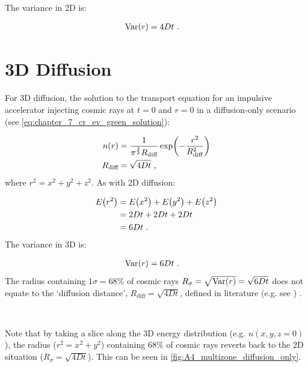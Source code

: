 \noindent The variance in 2D is:

\begin{equation}
    \begin{aligned}
        \mathrm{Var}\qty(r)&=4Dt\text{ .} 
    \end{aligned}
\end{equation}

\section{3D Diffusion}

For 3D diffusion, the solution to the transport equation for an impulsive accelerator injecting cosmic rays at $t=0$ and $r=0$ in a diffusion-only scenario (see \autoref{eq:chapter_7_cr_ev_green_solution}):

\begin{equation}
    \begin{aligned}
        n\qty(r)&=\frac{1}{\pi^{\frac{3}{2}} R_\text{diff}}\exp(-\frac{r^2}{R_\text{diff}^2}) \\
        R_\text{diff}&=\sqrt{4Dt}\text{ ,} 
    \end{aligned}
\end{equation}
\noindent where $r^2=x^2+y^2+z^2$. As with 2D diffusion:

\begin{equation}
    \begin{aligned}
        E\qty(r^2)&=E\qty(x^2)+E\qty(y^2)+E\qty(z^2) \\
        &= 2Dt + 2Dt + 2Dt \\
        &=6Dt\text{ .} 
    \end{aligned}
\end{equation}
\noindent The variance in 3D is:

\begin{equation}
    \begin{aligned}
        \mathrm{Var}\qty(r)&=6Dt\text{ .} 
    \end{aligned}
\end{equation}
\noindent The radius containing $1\sigma=68\%$ of cosmic rays $R_{\sigma}=\sqrt{\mathrm{Var}\qty(r)}=\sqrt{6Dt}$ does not equate to the `diffusion distance', $R_\text{diff}=\sqrt{4Dt}$, defined in literature (e.g. see \cite{1995PhRvD..52.3265A}) .
\par~\par 
Note that by taking a slice along the 3D energy distribution (e.g. $n(x,y,z=0)$), the radius ($r^2=x^2+y^2$) containing $68\%$ of cosmic rays reverts back to the 2D situation ($R_\sigma=\sqrt{4Dt}$). This can be seen in \autoref{fig:A4_multizone_diffusion_only}.


